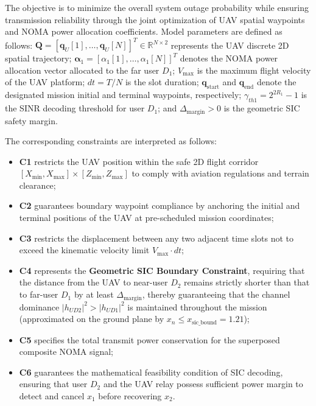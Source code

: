 The objective is to minimize the overall system outage probability while ensuring transmission reliability through the joint optimization of UAV spatial waypoints and NOMA power allocation coefficients. Model parameters are defined as follows: $\mathbf{Q} = [\mathbf{q}_U[1], \dots, \mathbf{q}_U[N]]^T \in \mathbb{R}^{N \times 2}$ represents the UAV discrete 2D spatial trajectory; $\boldsymbol{\alpha}_1 = [\alpha_1[1], \dots, \alpha_1[N]]^T$ denotes the NOMA power allocation vector allocated to the far user $D_1$; $V_{\max}$ is the maximum flight velocity of the UAV platform; $dt = T/N$ is the slot duration; $\mathbf{q}_{\text{start}}$ and $\mathbf{q}_{\text{end}}$ denote the designated mission initial and terminal waypoints, respectively; $\gamma_{th1} = 2^{2R_1} - 1$ is the SINR decoding threshold for user $D_1$; and $\Delta_{\text{margin}} > 0$ is the geometric SIC safety margin.

The corresponding constraints are interpreted as follows:
\begin{itemize}
    \item \textbf{C1} restricts the UAV position within the safe 2D flight corridor $[X_{\min}, X_{\max}] \times [Z_{\min}, Z_{\max}]$ to comply with aviation regulations and terrain clearance;
    \item \textbf{C2} guarantees boundary waypoint compliance by anchoring the initial and terminal positions of the UAV at pre-scheduled mission coordinates;
    \item \textbf{C3} restricts the displacement between any two adjacent time slots not to exceed the kinematic velocity limit $V_{\max} \cdot dt$;
    \item \textbf{C4} represents the \textbf{Geometric SIC Boundary Constraint}, requiring that the distance from the UAV to near-user $D_2$ remains strictly shorter than that to far-user $D_1$ by at least $\Delta_{\text{margin}}$, thereby guaranteeing that the channel dominance $|h_{UD2}|^2 > |h_{UD1}|^2$ is maintained throughout the mission (approximated on the ground plane by $x_n \le x_{\text{sic\_bound}} = 1.21$);
    \item \textbf{C5} specifies the total transmit power conservation for the superposed composite NOMA signal;
    \item \textbf{C6} guarantees the mathematical feasibility condition of SIC decoding, ensuring that user $D_2$ and the UAV relay possess sufficient power margin to detect and cancel $x_1$ before recovering $x_2$.
\end{itemize}

